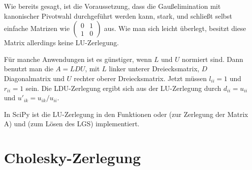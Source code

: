 Wie bereits gesagt, ist die Voraussetzung, dass die Gaußelimination
mit kanonischer Pivotwahl durchgeführt werden kann, stark, und
schließt selbst einfache Matrizen wie {\tiny $\begin{pmatrix} 0 & 1\\
    1 & 0\end{pmatrix}$} aus. Wie man sich leicht überlegt, besitzt
diese Matrix allerdings keine LU-Zerlegung.

Für manche Anwendungen ist es günstiger, wenn $L$ und $U$ normiert
sind. Dann benutzt man die  $A=LDU$, mit $L$
linker unterer Dreiecksmatrix, $D$ Diagonalmatrix und $U$ rechter
oberer Dreiecksmatrix. Jetzt müssen $l_{ii}=1$ und $r_{ii}=1$
sein. Die LDU-Zerlegung ergibt sich aus der LU-Zerlegung durch $d_{ii}
= u_{ii}$ und $u'_{ik}=u_{ik}/u_{ii}$.

In SciPy ist die LU-Zerlegung in den Funktionen
 oder  (zur
Zerlegung der Matrix A) und 
(zum Lösen des LGS) implementiert.

\section{Cholesky-Zerlegung}

